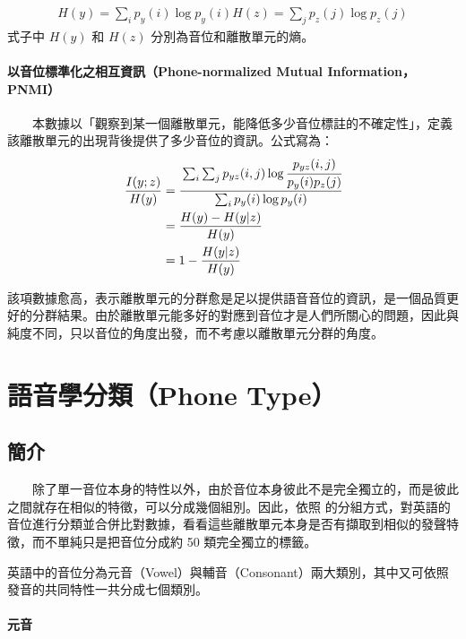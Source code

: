    \begin{align}
        H(y) = \sum_i{p_y(i)\log p_y(i)}
        H(z) = \sum_j{p_z(j)\log p_z(j)}
    \end{align}
式子中 $H(y)$ 和 $H(z)$ 分別為音位和離散單元的熵。

\paragraph{以音位標準化之相互資訊（Phone-normalized Mutual Information，PNMI）}

　　本數據以「觀察到某一個離散單元，能降低多少音位標註的不確定性」，定義該離散單元的出現背後提供了多少音位的資訊。公式寫為：
    \begin{align}
        \frac{I(y;z)}{H(y)}&=\cfrac{\sum_i \sum_j p_{yz}(i, j) \log \cfrac{p_{yz}(i, j)}{p_y(i)p_z(j)}}{\sum_i p_y(i) \log p_y(i)} \\
        &=\frac{H(y)-H(y|z)}{H(y)} \\
        &=1-\frac{H(y|z)}{H(y)}
    \end{align}

        該項數據愈高，表示離散單元的分群愈是足以提供語音音位的資訊，是一個品質更好的分群結果。由於離散單元能多好的對應到音位才是人們所關心的問題，因此與純度不同，只以音位的角度出發，而不考慮以離散單元分群的角度。



\section{語音學分類（Phone Type）}

\subsection{簡介}

　　除了單一音位本身的特性以外，由於音位本身彼此不是完全獨立的，而是彼此之間就存在相似的特徵，可以分成幾個組別。因此，依照  的分組方式，對英語的音位進行分類並合併比對數據，看看這些離散單元本身是否有擷取到相似的發聲特徵，而不單純只是把音位分成約 50 類完全獨立的標籤。


        英語中的音位分為元音（Vowel）與輔音（Consonant）兩大類別，其中又可依照發音的共同特性一共分成七個類別。

\paragraph{元音}

